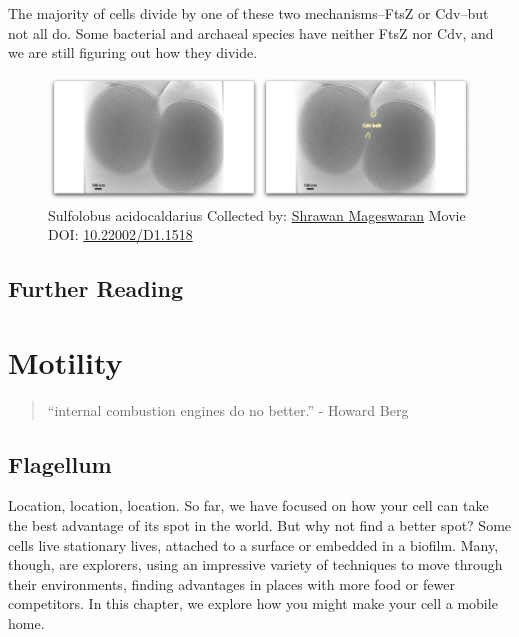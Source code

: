 \documentclass[]{tufte-book}
\begin{document}
The majority of cells divide by one of these two mechanisms--FtsZ or
Cdv--but not all do. Some bacterial and archaeal species have neither
FtsZ nor Cdv, and we are still figuring out how they divide.





\begin{figure}
\includegraphics{movie_stills/5_12} \caption[Sulfolobus acidocaldarius Collected by:
\protect\hyperlink{shrawan_mageswaran}{Shrawan Mageswaran} Movie DOI:
\href{https://doi.org/10.22002/D1.1518}{10.22002/D1.1518}]{Sulfolobus acidocaldarius Collected by:
\protect\hyperlink{shrawan_mageswaran}{Shrawan Mageswaran} Movie DOI:
\href{https://doi.org/10.22002/D1.1518}{10.22002/D1.1518}}\label{fig:5-12}
\end{figure}

\section{Further Reading}\label{further-reading-4}

\citep{badrinarayanan2015}

\citep{hirsch1974}

\citep{laloux2014}

\citep{reyes-lamothe2012}

\chapter{Motility}\label{motility}

\begin{quote}
``internal combustion engines do no better.'' - Howard Berg
\citep{berg1988}
\end{quote}

\section{Flagellum}\label{flagellum}

Location, location, location. So far, we have focused on how your cell
can take the best advantage of its spot in the world. But why not find a
better spot? Some cells live stationary lives, attached to a surface or
embedded in a biofilm. Many, though, are explorers, using an impressive
variety of techniques to move through their environments, finding
advantages in places with more food or fewer competitors. In this
chapter, we explore how you might make your cell a mobile home.
\end{document}
